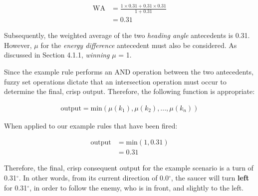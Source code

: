 {\LARGE
	\begin{align}
	\mbox{WA} &= \frac{1 \times 0.31 + 0.31 \times 0.31}{1 + 0.31} \\
	&= 0.31
	\end{align}
}

\noindent
Subsequently, the weighted average of the two \emph{heading angle} antecedents is 0.31. However, $\mu$ for the \emph{energy difference} antecedent must also be considered. As discussed in Section 4.1.1, \emph{winning} $\mu$ = 1.

Since the example rule performs an AND operation between the two antecedents, fuzzy set operations dictate that an intersection operation must occur to determine the final, crisp output. Therefore, the following function is appropriate:

{\LARGE
	\begin{align}
	\mbox{output} = \mbox{min}(\mu(k_1), \mu(k_2), \mbox{...}, \mu(k_n))
	\end{align}
}

\noindent
When applied to our example rules that have been fired:

{\LARGE
	\begin{align}
	\mbox{output} &= \mbox{min}(1, 0.31) \\
	&= 0.31
	\end{align}
}

\noindent
Therefore, the final, crisp consequent output for the example scenario is a turn of 0.31$^{\circ}$. In other words, from its current direction of 0.0$^{\circ}$, the saucer will turn \textbf{left} for 0.31$^{\circ}$, in order to follow the enemy, who is in front, and slightly to the left.